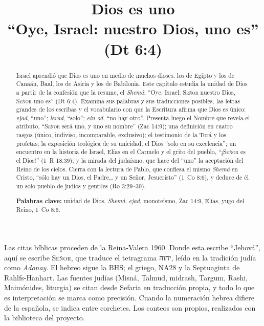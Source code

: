 \documentclass[11pt,letterpaper]{article}
\title{\color{azul}\bfseries Dios es uno\\[4pt]\large\color{gris}\mdseries ``Oye, Israel: \SENOR{} nuestro Dios, \SENOR{} uno es'' (Dt 6:4)}
\author{}\date{}
\newcommand{\heb}[1]{\mbox{\foreignlanguage{hebrew}{#1}}}
\newcommand{\SENOR}{\textsc{Señor}}
\begin{document}
\maketitle\thispagestyle{empty}

\begin{abstract}\noindent
Israel aprendió que Dios es uno en medio de muchos dioses: los de Egipto y los de Canaán, Baal, los de Asiria y los de Babilonia. Este capítulo estudia la unidad de Dios a partir de la confesión que la resume, el \emph{Shemá}: ``Oye, Israel: \SENOR{} nuestro Dios, \SENOR{} uno es'' (Dt 6:4). Examina sus palabras y sus traducciones posibles, las letras grandes de los escribas y el vocabulario con que la Escritura afirma que Dios es único: \emph{ejad}, ``uno''; \emph{levad}, ``solo''; \emph{ein od}, ``no hay otro''. Presenta luego el Nombre que revela el atributo, ``\SENOR{} será uno, y uno su nombre'' (Zac 14:9); una definición en cuatro rasgos (único, indiviso, incomparable, exclusivo); el testimonio de la Torá y los profetas; la exposición teológica de su unicidad, el Dios ``solo en su excelencia''; un encuentro en la historia de Israel, Elías en el Carmelo y el grito del pueblo, ``¡\SENOR{} es el Dios!'' (1~R 18:39); y la mirada del judaísmo, que hace del ``uno'' la aceptación del Reino de los cielos. Cierra con la lectura de Pablo, que confiesa el mismo \emph{Shemá} en Cristo, ``sólo hay un Dios, el Padre\ldots{} y un Señor, Jesucristo'' (1~Co 8:6), y deduce de él un solo pueblo de judíos y gentiles (Ro 3:29--30).
\par\smallskip\noindent\textbf{Palabras clave:} unidad de Dios, \emph{Shemá}, \emph{ejad}, monoteísmo, Zac 14:9, Elías, yugo del Reino, 1~Co 8:6.\end{abstract}

\begin{nota}
Las citas bíblicas proceden de la Reina-Valera 1960. Donde esta escribe ``Jehová'', aquí se escribe \SENOR, que traduce el tetragrama \heb{יהוה}, leído en la tradición judía como \emph{Adonay}. El hebreo sigue la BHS; el griego, NA28 y la Septuaginta de Rahlfs-Hanhart. Las fuentes judías (Misná, Talmud, midrash, Targum, Rashi, Maimónides, liturgia) se citan desde Sefaria en traducción propia, y todo lo que es interpretación se marca como precisión. Cuando la numeración hebrea difiere de la española, se indica entre corchetes. Los conteos son propios, realizados con la biblioteca del proyecto.
\end{nota}

\end{document}
